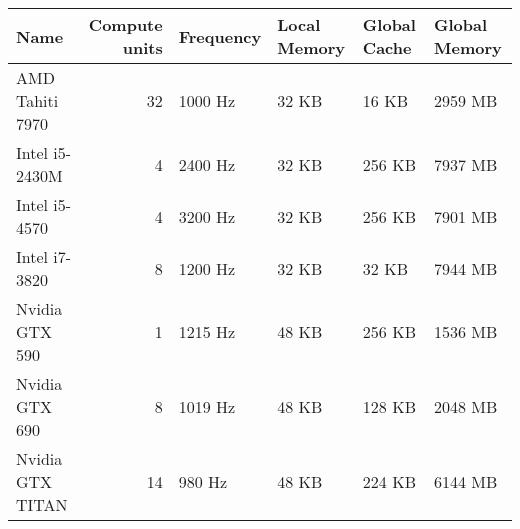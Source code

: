 \begin{tabular}{lrllll}
  \toprule
  Name & Compute units & Frequency & Local Memory & Global Cache & Global Memory \\
  \midrule
  AMD Tahiti 7970 & 32 & 1000 Hz & 32 KB & 16 KB & 2959 MB \\
  Intel i5-2430M & 4 & 2400 Hz & 32 KB & 256 KB & 7937 MB \\
  Intel i5-4570 & 4 & 3200 Hz & 32 KB & 256 KB & 7901 MB \\
  Intel i7-3820 & 8 & 1200 Hz & 32 KB & 32 KB & 7944 MB \\
  Nvidia GTX 590 & 1 & 1215 Hz & 48 KB & 256 KB & 1536 MB \\
  Nvidia GTX 690 & 8 & 1019 Hz & 48 KB & 128 KB & 2048 MB \\
  Nvidia GTX TITAN & 14 & 980 Hz & 48 KB & 224 KB & 6144 MB \\
  \bottomrule
\end{tabular}

